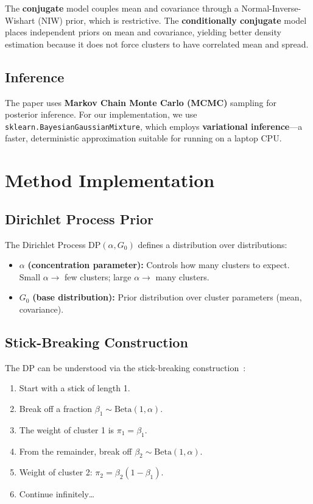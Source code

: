 \documentclass[conference]{IEEEtran}
\begin{document}
The \textbf{conjugate} model couples mean and covariance through a Normal-Inverse-Wishart (NIW) prior, which is restrictive. The \textbf{conditionally conjugate} model places independent priors on mean and covariance, yielding better density estimation because it does not force clusters to have correlated mean and spread.

\subsection{Inference}

The paper uses \textbf{Markov Chain Monte Carlo (MCMC)} sampling for posterior inference. For our implementation, we use \texttt{sklearn.BayesianGaussianMixture}, which employs \textbf{variational inference}---a faster, deterministic approximation suitable for running on a laptop CPU.

\section{Method Implementation}

\subsection{Dirichlet Process Prior}

The Dirichlet Process $\text{DP}(\alpha, G_0)$ defines a distribution over distributions:
\begin{itemize}
    \item $\alpha$ \textbf{(concentration parameter):} Controls how many clusters to expect. Small $\alpha \rightarrow$ few clusters; large $\alpha \rightarrow$ many clusters.
    \item $G_0$ \textbf{(base distribution):} Prior distribution over cluster parameters (mean, covariance).
\end{itemize}

\subsection{Stick-Breaking Construction}

The DP can be understood via the stick-breaking construction~\cite{sethuraman1994}:
\begin{enumerate}
    \item Start with a stick of length 1.
    \item Break off a fraction $\beta_1 \sim \text{Beta}(1, \alpha)$.
    \item The weight of cluster 1 is $\pi_1 = \beta_1$.
    \item From the remainder, break off $\beta_2 \sim \text{Beta}(1, \alpha)$.
    \item Weight of cluster 2: $\pi_2 = \beta_2(1 - \beta_1)$.
    \item Continue infinitely\ldots
\end{enumerate}
\end{document}
